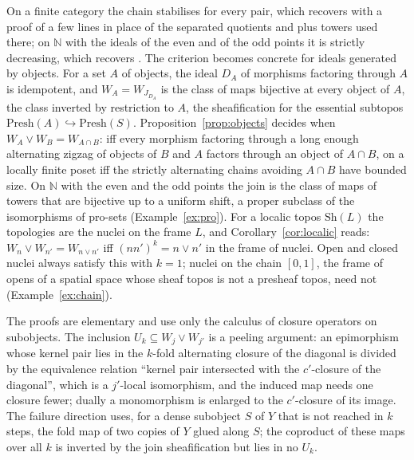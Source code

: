 \documentclass[11pt]{amsart}
\theoremstyle{definition}
\newcommand{\Presh}{\mathrm{Presh}}
\newcommand{\Sh}{\mathrm{Sh}}
\begin{document}
On a finite category the chain stabilises for every pair, which recovers
\cite{Finitejoin} with a proof of a few lines in place of the separated
quotients and plus towers used there; on $\mathbb N$ with the ideals of the
even and of the odd points it is strictly decreasing, which recovers
\cite[Thm.~7.1]{Topjoin}. The criterion becomes concrete for ideals generated
by objects. For a set $A$ of objects, the ideal $D_A$ of morphisms factoring
through $A$ is idempotent, and $W_A=W_{J_{D_A}}$ is the class of maps
bijective at every object of $A$, the class inverted by restriction to $A$,
the sheafification for the essential subtopos
$\Presh(A)\hookrightarrow\Presh(S)$. Proposition~\ref{prop:objects} decides
when $W_A\vee W_B=W_{A\cap B}$: iff every morphism factoring through a long
enough alternating zigzag of objects of $B$ and $A$ factors through an object
of $A\cap B$, on a locally finite poset iff the strictly alternating chains
avoiding $A\cap B$ have bounded size. On $\mathbb N$ with the even and the odd
points the join is the class of maps of towers that are bijective up to a
uniform shift, a proper subclass of the isomorphisms of pro-sets
(Example~\ref{ex:pro}). For a localic topos $\Sh(L)$ the topologies are the
nuclei on the frame $L$, and Corollary~\ref{cor:localic} reads: $W_n\vee
W_{n'}=W_{n\vee n'}$ iff $(nn')^k=n\vee n'$ in the frame of nuclei. Open and
closed nuclei always satisfy this with $k=1$; nuclei on the chain $[0,1]$,
the frame of opens of a spatial space whose sheaf topos is not a presheaf
topos, need not (Example~\ref{ex:chain}).

The proofs are elementary and use only the calculus of closure operators on
subobjects. The inclusion $U_k\subseteq W_j\vee W_{j'}$ is a peeling
argument: an epimorphism whose kernel pair lies in the $k$-fold alternating
closure of the diagonal is divided by the equivalence relation ``kernel pair
intersected with the $c'$-closure of the diagonal'', which is a $j'$-local
isomorphism, and the induced map needs one closure fewer; dually a
monomorphism is enlarged to the $c'$-closure of its image. The failure
direction uses, for a dense subobject $S$ of $Y$ that is not reached in $k$
steps, the fold map of two copies of $Y$ glued along $S$; the coproduct of
these maps over all $k$ is inverted by the join sheafification but lies in
no $U_k$.
\end{document}
